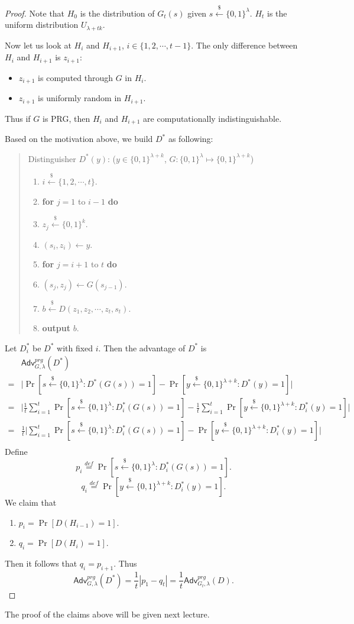 \documentclass[12pt]{article}
\newcommand{\eqdef}{\stackrel{def}{=}}
\newcommand{\bits}{\{0,1\}}
\newcommand{\getsr}{\stackrel{\$}{\gets}}
\newcommand{\Adv}{\mathsf{Adv}}
\newcommand{\tab}{\hspace{0.3in}}
\theoremstyle{definition}
\begin{document}
\begin{proof}
Note that $H_0$ is the distribution of $G_t(s)$ given $s \getsr \bits^\lambda$. $H_t$ is the uniform distribution $U_{\lambda+tk}$.

Now let us look at $H_i$ and $H_{i+1}$, $i \in \{1, 2, \cdots, t-1\}$. The only difference between $H_i$ and $H_{i+1}$ is $z_{i+1}$:
\begin{itemize}
\item $z_{i+1}$ is computed through $G$ in $H_i$.
\item $z_{i+1}$ is uniformly random in $H_{i+1}$.
\end{itemize}
Thus if $G$ is PRG, then $H_i$ and $H_{i+1}$ are computationally indistinguishable.

Based on the motivation above, we build $D^*$ as following:
\begin{quote}
Distinguisher $D^* (y)$: ($y \in \bits^{\lambda+k}$, $G : \bits^\lambda \mapsto \bits^{\lambda+k}$)
\begin{enumerate}
\item $i \getsr \{1, 2, \cdots, t\}$.
\item {\bf for} $j=1$ to $i-1$ {\bf do}
\item \tab $z_j \getsr \bits^k$.
\item $(s_i, z_i) \gets y$.
\item {\bf for} $j=i+1$ to $t$ {\bf do}
\item \tab $(s_j, z_j) \gets G(s_{j-1})$.
\item $b \getsr D(z_1, z_2, \cdots, z_t, s_t)$.
\item {\bf output} $b$.
\end{enumerate}
\end{quote}
Let $D_i^*$ be $D^*$ with fixed $i$. Then the advantage of $D^*$ is
$$\begin{aligned}
&\Adv_{G,\lambda}^{prg}(D^*) \\
=& \bigg| \Pr[s \getsr \bits^\lambda : D^*(G(s)) = 1] - \Pr[y \getsr \bits^{\lambda+k} : D^*(y) = 1] \bigg| \\
=& \bigg| \frac{1}{t}\sum_{i=1}^t \Pr[s \getsr \bits^\lambda : D_i^*(G(s)) = 1] - \frac{1}{t}\sum_{i=1}^t \Pr[y \getsr \bits^{\lambda+k} : D_i^*(y) = 1] \bigg| \\
=& \frac{1}{t}\bigg| \sum_{i=1}^t \Pr[s \getsr \bits^\lambda : D_i^*(G(s)) = 1] - \Pr[y \getsr \bits^{\lambda+k} : D_i^*(y) = 1] \bigg| \\
\end{aligned}$$
Define
$$p_i \eqdef \Pr[s \getsr \bits^\lambda : D_i^*(G(s)) = 1].$$
$$q_i \eqdef \Pr[y \getsr \bits^{\lambda+k} : D_i^*(y) = 1].$$
We claim that
\begin{enumerate}
\item $p_i = \Pr[D(H_{i-1}) = 1]$.
\item $q_i = \Pr[D(H_i) = 1]$.
\end{enumerate}
Then it follows that $q_i = p_{i+1}$. Thus
$$\Adv_{G,\lambda}^{prg}(D^*) = \frac{1}{t}|p_1 - q_t| = \frac{1}{t} \Adv_{G_t, \lambda}^{prg}(D).$$
\end{proof}
The proof of the claims above will be given next lecture.
\end{document}

